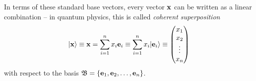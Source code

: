 In terms of these standard base vectors, every vector ${\bf x}$
can be written as a linear combination -- in quantum physics, this is called
{\em coherent superposition}
\begin{equation}
\vert {\bf x} \rangle \equiv {\bf x} = \sum_{i=1}^n x_i{\bf e}_i \equiv  \sum_{i=1}^n x_i \vert {\bf e}_i \rangle
\equiv
\begin{pmatrix}x_1\\x_2\\ \vdots \\ x_n\end{pmatrix}
\label{2016-m-fdvs-rv0}
\end{equation}
with respect  to the basis
${\frak B}= \{ {\bf e}_1 ,
  {\bf e}_2   ,
\ldots ,
 {\bf e}_n
\}$.

